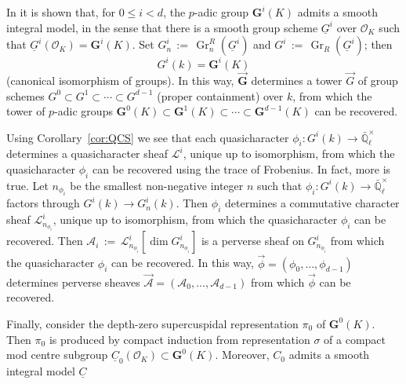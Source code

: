 \documentclass[10pt]{amsart}
\theoremstyle{plain}
\theoremstyle{definition}
\newcommand{\EE}{\mathbb{\bar Q}_\ell}
\newcommand{\OK}{\mathcal{O}_K}
\newcommand{\Fq}{k}
\newcommand{\EEx}{\EE^\times}
\newcommand{\G}{\textbf{G}}
\DeclareMathOperator{\Gr}{Gr}
\newcommand{\ceq}{{\, :=\, }}
\newcommand{\cs}[1]{{\mathcal{#1}}}
\begin{document}

In \cite{yu:03a} it is shown that, for $0 \leq i < d$, the $p$-adic group $\G^i(K)$ admits a smooth integral model, in the sense that there is a smooth group scheme $\underline{G}^i$ over $\OK$ such that $\underline{G}^i(\OK) = \G^i(K)$.
Set $G^i_n \ceq \Gr^R_n(\underline{G}^i)$ and $G^i \ceq \Gr_R(\underline{G}^i)$; 
then \[G^i(\Fq) = \G^i(K)\] (canonical isomorphism of groups).
In this way, $\vec{\G}$ determines a tower $\vec{G}$ of group schemes $G^0 \subset G^1 \subset \cdots  \subset G^{d-1}$ (proper containment) over $\Fq$, from which the tower of $p$-adic groups
$\G^0(K) \subset \G^1(K) \subset \cdots  \subset \G^{d-1}(K)$ can be recovered.

Using Corollary~\ref{cor:QCS} we see that each quasicharacter $\phi_i : G^i(\Fq) \to \EEx$ determines a quasicharacter sheaf $\cs{L}^i$, unique up to isomorphism, from which the quasicharacter $\phi_i$ can be recovered using the trace of Frobenius. 
In fact, more is true. Let $n_{\phi_i}$ be the smallest non-negative integer $n$ such that $\phi_i : G^i(\Fq) \to \EEx$ factors through $G^i(\Fq) \to G^i_n(\Fq)$.
Then $\phi_i$ determines a commutative character sheaf $\cs{L}_{n_{\phi_i}}^i$, unique up to isomorphism, from which the quasicharacter $\phi_i$ can be recovered.
Then $\cs{A}_i\ceq \cs{L}_{n_{\phi_i}}^i[\dim G_{n_{\phi_i}}^i]$ is a perverse sheaf on $G_{n_{\phi_i}}^i$ from which the quasicharacter $\phi_i$ can be recovered.
In this way,  $\vec{\phi} = (\phi_0, \ldots , \phi_{d-1})$ determines perverse sheaves $\vec{\cs{A}} = (\cs{A}_0, \ldots , \cs{A}_{d-1})$ from which $\vec{\phi}$ can be recovered. 

Finally, consider the depth-zero supercuspidal representation $\pi_0$ of $\G^0(K)$.
Then $\pi_0$ is produced by compact induction from representation $\sigma$ of a compact mod centre subgroup $\underline{C}_0(\OK) \subset \G^0(K)$. Moreover, $C_0$ admits a smooth integral model $\underline{C}$ 



\end{document}
